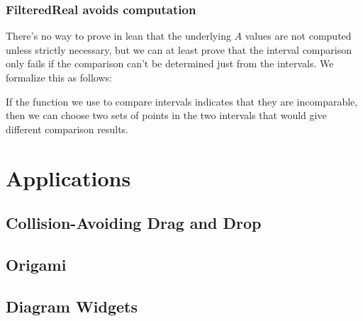 \subsection{FilteredReal avoids computation}

There's no way to prove in lean that the underlying $A$ values are not computed
unless strictly necessary, but we can at least prove that the interval
comparison only fails if the comparison can't be determined just from the
intervals. We formalize this as follows:

\begin{lemma}
  \label{thm:compareComplete}
  If the function we use to compare intervals indicates that they are
  incomparable, then we can choose two sets of points in the two intervals that
  would give different comparison results.
\end{lemma}

\chapter{Applications}

\section{Collision-Avoiding Drag and Drop}

\section{Origami}

\section{Diagram Widgets}


